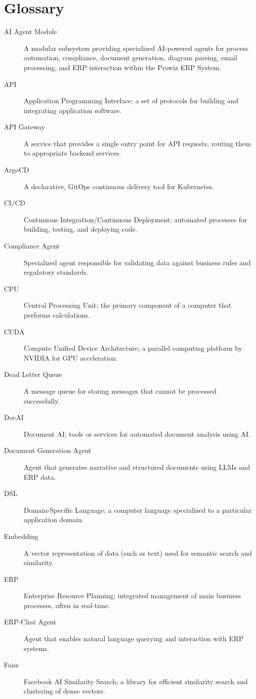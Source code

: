 \documentclass[12pt]{report}
\begin{document}
\chapter{Glossary}
\begin{description}
  \item[AI Agent Module] A modular subsystem providing specialized AI-powered agents for process automation, compliance, document generation, diagram parsing, email processing, and ERP interaction within the Prowiz ERP System.
  \item[API] Application Programming Interface; a set of protocols for building and integrating application software.
  \item[API Gateway] A service that provides a single entry point for API requests, routing them to appropriate backend services.
  \item[ArgoCD] A declarative, GitOps continuous delivery tool for Kubernetes.
  \item[CI/CD] Continuous Integration/Continuous Deployment; automated processes for building, testing, and deploying code.
  \item[Compliance Agent] Specialized agent responsible for validating data against business rules and regulatory standards.
  \item[CPU] Central Processing Unit; the primary component of a computer that performs calculations.
  \item[CUDA] Compute Unified Device Architecture; a parallel computing platform by NVIDIA for GPU acceleration.
  \item[Dead Letter Queue] A message queue for storing messages that cannot be processed successfully.
  \item[DocAI] Document AI; tools or services for automated document analysis using AI.
  \item[Document Generation Agent] Agent that generates narrative and structured documents using LLMs and ERP data.
  \item[DSL] Domain-Specific Language; a computer language specialized to a particular application domain.
  \item[Embedding] A vector representation of data (such as text) used for semantic search and similarity.
  \item[ERP] Enterprise Resource Planning; integrated management of main business processes, often in real-time.
  \item[ERP-Chat Agent] Agent that enables natural language querying and interaction with ERP systems.
  \item[Faiss] Facebook AI Similarity Search; a library for efficient similarity search and clustering of dense vectors.

\end{description}
\end{document}
